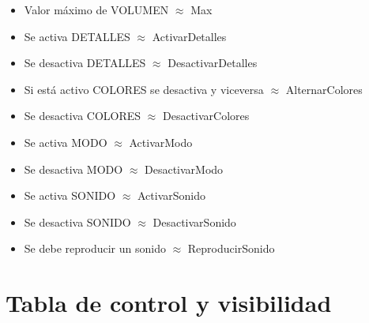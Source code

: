 \documentclass[11pt]{article}
\begin{document}
\begin{itemize}
\item Valor máximo de VOLUMEN $\approx$ Max
\item Se activa DETALLES $\approx$ ActivarDetalles
\item Se desactiva DETALLES $\approx$ DesactivarDetalles
\item Si está activo COLORES se desactiva y viceversa $\approx$ AlternarColores
\item Se desactiva COLORES $\approx$ DesactivarColores
\item Se activa MODO $\approx$ ActivarModo
\item Se desactiva MODO $\approx$ DesactivarModo
\item Se activa SONIDO $\approx$ ActivarSonido
\item Se desactiva SONIDO $\approx$ DesactivarSonido
\item Se debe reproducir un sonido $\approx$ ReproducirSonido
\end{itemize}
\section*{Tabla de control y visibilidad}
\end{document}
